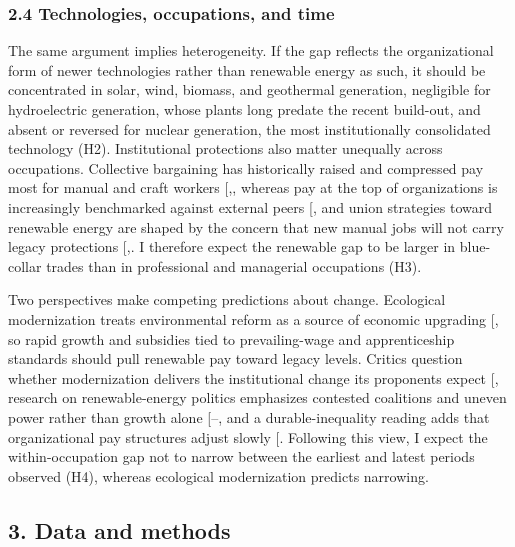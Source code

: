 \documentclass[
  11pt,
]{article}
\begin{document}
\subsubsection{2.4 Technologies, occupations, and
time}\label{technologies-occupations-and-time}

The same argument implies heterogeneity. If the gap reflects the
organizational form of newer technologies rather than renewable energy
as such, it should be concentrated in solar, wind, biomass, and
geothermal generation, negligible for hydroelectric generation, whose
plants long predate the recent build-out, and absent or reversed for
nuclear generation, the most institutionally consolidated technology
(H2). Institutional protections also matter unequally across
occupations. Collective bargaining has historically raised and
compressed pay most for manual and craft workers
{[},\citeproc{ref-western2011unions}{33}{]},
whereas pay at the top of organizations is increasingly benchmarked
against external peers {[}\citeproc{ref-diprete2010compensation}{38}{]},
and union strategies toward renewable energy are shaped by the concern
that new manual jobs will not carry legacy protections
{[},\citeproc{ref-vachon2023clean}{40}{]}.
I therefore expect the renewable gap to be larger in blue-collar trades
than in professional and managerial occupations (H3).

Two perspectives make competing predictions about change. Ecological
modernization treats environmental reform as a source of economic
upgrading {[}\citeproc{ref-spaargaren1992sociology}{10}{]}, so rapid
growth and subsidies tied to prevailing-wage and apprenticeship
standards should pull renewable pay toward legacy levels. Critics
question whether modernization delivers the institutional change its
proponents expect {[}\citeproc{ref-york2003key}{41}{]}, research on
renewable-energy politics emphasizes contested coalitions and uneven
power rather than growth alone
{[}--\citeproc{ref-hess2012good}{44}{]},
and a durable-inequality reading adds that organizational pay structures
adjust slowly {[}\citeproc{ref-tilly1998durable}{8}{]}. Following this
view, I expect the within-occupation gap not to narrow between the
earliest and latest periods observed (H4), whereas ecological
modernization predicts narrowing.

\subsection{3. Data and methods}\label{data-and-methods}
\end{document}
